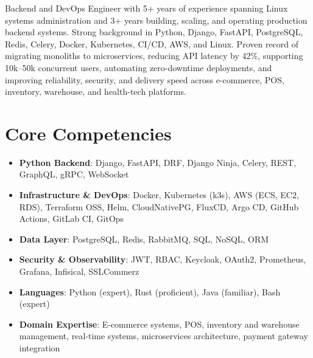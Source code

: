\documentclass[11pt,a4paper,sans]{moderncv}
\begin{document}
\makecvtitle


\vspace{6pt}
\small{Backend and DevOps Engineer with 5+ years of experience spanning Linux systems administration and 3+ years building, scaling, and operating production backend systems. Strong background in Python, Django, FastAPI, PostgreSQL, Redis, Celery, Docker, Kubernetes, CI/CD, AWS, and Linux. Proven record of migrating monoliths to microservices, reducing API latency by 42\%, supporting 10k--50k concurrent users, automating zero-downtime deployments, and improving reliability, security, and delivery speed across e-commerce, POS, inventory, warehouse, and health-tech platforms.}


\section{Core Competencies}
\vspace{1pt}
\begin{itemize}

\item \textbf{Python Backend}: Django, FastAPI, DRF, Django Ninja, Celery, REST, GraphQL, gRPC, WebSocket

\item \textbf{Infrastructure \& DevOps}: Docker, Kubernetes (k3s), AWS (ECS, EC2, RDS), Terraform OSS, Helm, CloudNativePG, FluxCD, Argo CD, GitHub Actions, GitLab CI, GitOps

\item \textbf{Data Layer}: PostgreSQL, Redis, RabbitMQ, SQL, NoSQL, ORM

\item \textbf{Security \& Observability}: JWT, RBAC, Keycloak, OAuth2, Prometheus, Grafana, Infisical, SSLCommerz

\item \textbf{Languages}: Python (expert), Rust (proficient), Java (familiar), Bash (expert)

\item \textbf{Domain Expertise}: E-commerce systems, POS, inventory and warehouse management, real-time systems, microservices architecture, payment gateway integration

\end{itemize}
\end{document}
